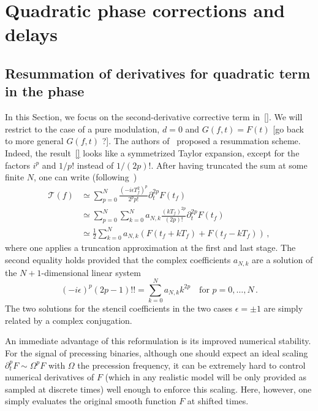 \documentclass[aps,showpacs,%
prd,superscriptaddress,nofootinbib]{revtex4}
\newcommand{\be}{\begin{equation}}
\newcommand{\ee}{\end{equation}}
\newcommand\calT{{\mathcal{T}}}
\newcommand{\nn}{\nonumber}
\newcommand{\tf}{t_{f}}
\newcommand{\Tf}{T_{f}}
\begin{document}

\section{Quadratic phase corrections and delays}
\label{sec:quadphasedelay}


\subsection{Resummation of derivatives for quadratic term in the phase}
\label{subsec:resumquadphase}

In this Section, we focus on the second-derivative corrective term in~\eqref{}. We will restrict to the case of a pure modulation, $d=0$ and $G(f,t) = F(t)$ [go back to more general $G(f,t)$ ?]. The authors of~\cite{KCY14} proposed a resummation scheme. Indeed, the result~\eqref{} looks like a symmetrized Taylor expansion, except for the factors $i^{p}$ and $1/p!$ instead of $1/(2p)!$. After having truncated the sum at some finite $N$, one can write (following~\cite{KCY14})
\begin{align}\label{eq:resumquadphase}
	\calT(f) &\simeq \sum\limits_{p = 0}^{N} \frac{(-i\epsilon\Tf^{2})^{p}}{2^{p}p!} \partial_{t}^{2p}F(\tf) \nn\\
	&\simeq \sum\limits_{p= 0}^{N} \sum\limits_{k=0}^{N} a_{N,k}\frac{(k\Tf)^{2p}}{(2p)!}  \partial_{t}^{2p}F(\tf) \nn\\
	&\simeq \frac{1}{2}\sum\limits_{k=0}^{N} a_{N,k} \left( F(\tf + k\Tf) + F(\tf-k\Tf) \right)\,,
\end{align}
where one applies a truncation approximation at the first and last stage. The second equality holds provided that the complex coefficients $a_{N,k}$ are a solution of the $N+1$-dimensional linear system
\be\label{eq:stencilsystem}
	(-i\epsilon)^{p} (2p-1)!! = \sum\limits_{k=0}^{N} a_{N,k} k^{2p} \quad \text{for } p=0,\dots,N \,.
\ee
The two solutions for the stencil coefficients in the two cases $\epsilon = \pm 1$ are simply related by a complex conjugation.

An immediate advantage of this reformulation is its improved numerical stability. For the signal of precessing binaries, although one should expect an ideal scaling $\partial_{t}^{p} F \sim \Omega^{p} F$ with $\Omega$ the precession frequency, it can be extremely hard to control numerical derivatives of $F$ (which in any realistic model will be only provided as sampled at discrete times) well enough to enforce this scaling. Here, however, one simply evaluates the original smooth function $F$ at shifted times.
\end{document}
